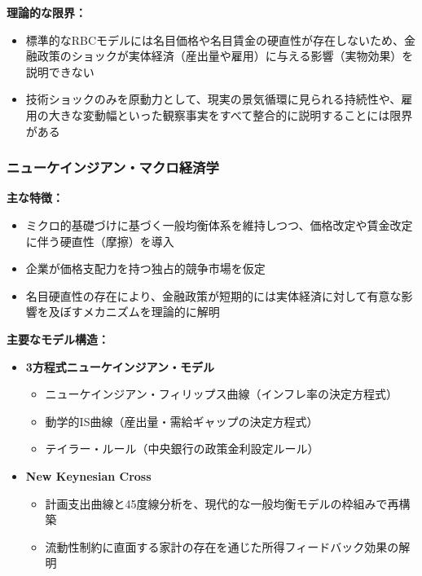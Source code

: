 \documentclass[
  japanese,
  lualatex,
  ja=standard,
  12pt,
  a4paper]{ltjsarticle}
\providecommand{\tightlist}{%
  \setlength{\itemsep}{0pt}\setlength{\parskip}{0pt}}
\begin{document}

\textbf{理論的な限界：}

\begin{itemize}
\tightlist
\item
  標準的なRBCモデルには名目価格や名目賃金の硬直性が存在しないため、金融政策のショックが実体経済（産出量や雇用）に与える影響（実物効果）を説明できない
\item
  技術ショックのみを原動力として、現実の景気循環に見られる持続性や、雇用の大きな変動幅といった観察事実をすべて整合的に説明することには限界がある
\end{itemize}


\subsubsection{ニューケインジアン・マクロ経済学}\label{ux30cbux30e5ux30fcux30b1ux30a4ux30f3ux30b8ux30a2ux30f3ux30deux30afux30edux7d4cux6e08ux5b66}

\textbf{主な特徴：}

\begin{itemize}
\tightlist
\item
  ミクロ的基礎づけに基づく一般均衡体系を維持しつつ、価格改定や賃金改定に伴う硬直性（摩擦）を導入
\item
  企業が価格支配力を持つ独占的競争市場を仮定
\item
  名目硬直性の存在により、金融政策が短期的には実体経済に対して有意な影響を及ぼすメカニズムを理論的に解明
\end{itemize}


\textbf{主要なモデル構造：}

\begin{itemize}
\tightlist
\item
  \textbf{3方程式ニューケインジアン・モデル}

  \begin{itemize}
  \tightlist
  \item
    ニューケインジアン・フィリップス曲線（インフレ率の決定方程式）
  \item
    動学的IS曲線（産出量・需給ギャップの決定方程式）
  \item
    テイラー・ルール（中央銀行の政策金利設定ルール）
  \end{itemize}
\item
  \textbf{New Keynesian Cross}

  \begin{itemize}
  \tightlist
  \item
    計画支出曲線と45度線分析を、現代的な一般均衡モデルの枠組みで再構築
  \item
    流動性制約に直面する家計の存在を通じた所得フィードバック効果の解明
  \end{itemize}
\end{itemize}
\end{document}
